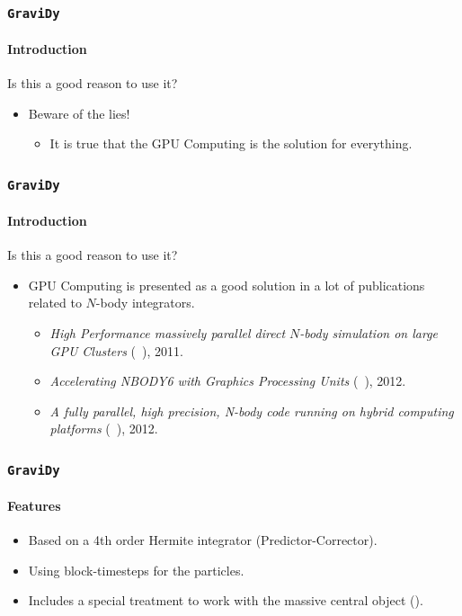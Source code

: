 \begin{frame}
    \frametitle{\texttt{GraviDy}}
    \framesubtitle{Introduction}

    Is this a good reason to use it?

    \begin{itemize}
        \item<2-> Beware of the lies!
        \begin{itemize}
            \item<2-> It is  true that the GPU Computing is the solution
                      for everything.
        \end{itemize}
    \end{itemize}
\end{frame}

\begin{frame}
    \frametitle{\texttt{GraviDy}}
    \framesubtitle{Introduction}

    Is this a good reason to use it?

    \begin{itemize}
        \item<1-> GPU Computing is presented as a good solution in a lot of publications
                 related to $N$-body integrators.
        \begin{itemize}
            \item<2-> \emph{High Performance massively parallel direct $N$-body simulation on
                      large GPU Clusters}
                      (~\cite{berczik2011high}), 2011.
            \item<3-> \emph{Accelerating NBODY6 with Graphics Processing Units}
                      (~\cite{2012MNRAS.424..545N}), 2012.
            \item<4-> \emph{A fully parallel, high precision, N-body code running on hybrid
                      computing platforms}
                      (~\cite{2012arXiv1207.2367C}), 2012.
        \end{itemize}
    \end{itemize}
\end{frame}

\begin{frame}
    \frametitle{\texttt{GraviDy}}
    \framesubtitle{Features}
    \begin{itemize}
        \item Based on a 4th order Hermite integrator (Predictor-Corrector).
        \item Using block-timesteps for the particles.
        \item Includes a special treatment to work with the massive central object ().
    \end{itemize}
\end{frame}

